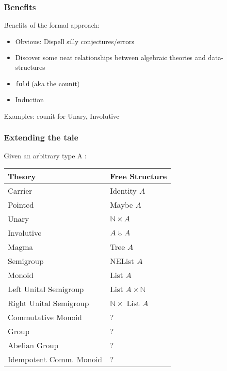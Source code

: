 \documentclass[serif,mathserif,professionalfont,10pt]{beamer}
\newcommand{\sred}[1]{\textcolor{slidered}{#1}}
\begin{document}
\begin{frame}
\frametitle{Benefits}
Benefits of the formal approach:
\begin{itemize}
\item Obvious: Dispell silly conjectures/errors
\item Discover some neat relationships between algebraic theories and data-structures
\item \texttt{fold} (aka the counit)
\item Induction
\end{itemize} \vspace*{4mm}
\pause
Examples: counit for Unary, Involutive
\vfill
\end{frame}

\begin{frame}
\frametitle{Extending the tale}
Given an arbitrary type A : \\ \vspace*{4mm}
\begin{tabular}{ll}
\textbf{Theory} & \textbf{Free Structure} \\ \hline
Carrier & Identity $A$ \\
Pointed & Maybe $A$ \\ \hline
Unary & $ℕ × A$  \\
Involutive & $A ⊎ A$ \\ \hline
Magma & Tree $A$  \\
Semigroup & NEList $A$  \\ \hline
Monoid & List $A$ \\
Left Unital Semigroup & List $A × ℕ$ \\
Right Unital Semigroup & $ℕ ×$ List $A$ \\ \hline
\sred{Commutative Monoid} & \sred{?} \\
\sred{Group} & \sred{?} \\
\sred{Abelian Group} & \sred{?} \\
\sred{Idempotent Comm. Monoid} & \sred{?} \\
\end{tabular}
\end{frame}
\end{document}
